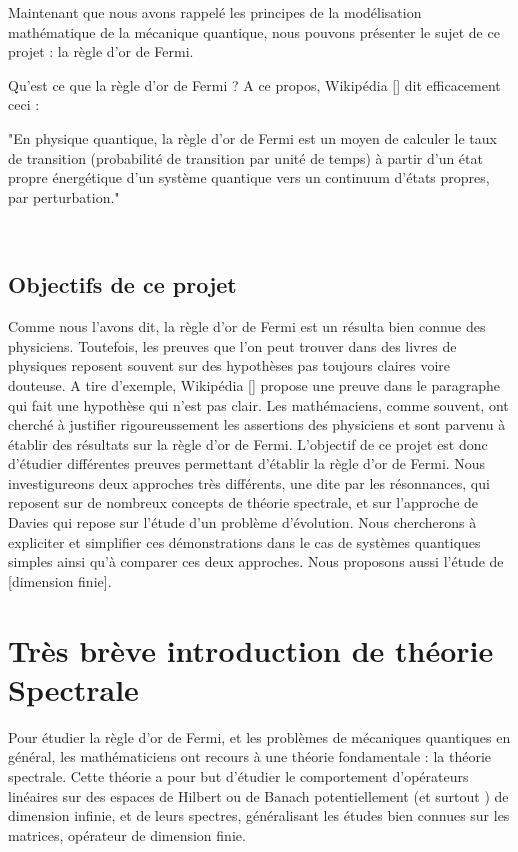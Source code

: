 \documentclass[12pt,openany,a4paper, titlepage]{article}
\theoremstyle{definition}
\theoremstyle{definition}
\theoremstyle{definition}
\theoremstyle{definition}
\theoremstyle{definition}
\theoremstyle{definition}
\begin{document}
Maintenant que nous avons rappelé les principes de la modélisation mathématique de la mécanique quantique, nous pouvons présenter le sujet de ce projet : la règle d'or de Fermi. 

Qu'est ce que la règle d'or de Fermi ? A ce propos, Wikipédia [] dit efficacement ceci : \\

\begin{it}
    "En physique quantique, la règle d'or de Fermi est un moyen de calculer le taux de transition (probabilité de transition par unité de temps) à partir d'un état propre énergétique d'un système quantique vers un continuum d'états propres, par perturbation."
\end{it}\\






\subsection{Objectifs de ce projet}

Comme nous l'avons dit, la règle d'or de Fermi est un résulta bien connue des physiciens. Toutefois, les preuves que l'on peut trouver dans des livres de physiques reposent souvent sur des hypothèses pas toujours claires voire douteuse. A tire d'exemple, Wikipédia [] propose une preuve dans le paragraphe qui fait une hypothèse qui n'est pas clair. Les mathémaciens, comme souvent, ont cherché à justifier rigoureussement les assertions des physiciens et sont parvenu à établir des résultats sur la règle d'or de Fermi. L'objectif de ce projet est donc d'étudier différentes preuves permettant d'établir la règle d'or de Fermi. Nous investigureons deux approches très différents, une dite par les résonnances, qui reposent sur de nombreux concepts de théorie spectrale, et sur l'approche de Davies qui repose sur l'étude d'un problème d'évolution. Nous chercherons à expliciter et simplifier ces démonstrations  dans le cas de systèmes quantiques simples ainsi qu'à comparer ces deux approches. Nous proposons aussi l'étude de [dimension finie]. 

\newpage
\section{Très brève introduction de théorie Spectrale}

Pour étudier la règle d'or de Fermi, et les problèmes de mécaniques quantiques en général, les mathématiciens ont recours à une théorie fondamentale : la théorie spectrale. Cette théorie a pour but d'étudier le comportement d'opérateurs linéaires sur des espaces de Hilbert ou de Banach potentiellement (et surtout ) de dimension infinie, et de leurs spectres, généralisant les études bien connues sur les matrices, opérateur de dimension finie. 
\end{document}
